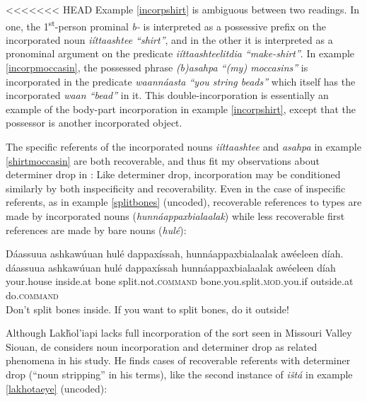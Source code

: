 \documentclass[output=paper]{LSP/langsci}
\begin{document}
<<<<<<< HEAD
Example \ref{incorpshirt} is ambiguous between two readings. In one, the 1\textsuperscript{st}-person prominal \emph{b-} is interpreted as a possessive prefix on the incorporated noun  \emph{iíttaashtee “shirt”}, and in the other it is interpreted as a pronominal argument on the predicate \emph{iíttaashteelitdia “make-shirt”}. In example \ref{incorpmoccasin}, the possessed phrase \emph{(b)asahpa “(my) moccasins”} is incorporated in the predicate \emph{waannáasta “you string beads”} which itself has the incorporated \emph{waan “bead”} in it. This double-incorporation is essentially an example of the body-part incorporation in example \ref{incorpshirt}, except that the possessor is another incorporated object.

	The specific referents of the incorporated nouns \emph{iíttaashtee} and \emph{asahpa} in example \ref{shirtmoccasin} are both recoverable, and thus fit my observations about determiner drop in : Like determiner drop, incorporation may be conditioned similarly by both inspecificity and recoverability. Even in the case of inspecific referents, as in example \ref{splitbones} (uncoded), recoverable references to types are made by incorporated nouns (\emph{‎hunnáappaxbialaalak}) while less recoverable first references are made by bare nouns (\emph{hulé}):
	 
\ea\label{splitbones}
 	Dáassuua ashkawúuan hulé dappaxíssah, hunnáappaxbialaalak awéeleen díah.\footnotemark\\
\gll	dáassuua		ashkawúuan		hulé		dappaxíssah				hunnáappaxbialaalak			awéeleen		díah\\
	your.house		inside.at		bone		split.not.\textsc{command}	bone.you.split.\textsc{mod}.you.if	outside.at		do.\textsc{command}\\
\glt	Don’t split bones inside. If you want to split bones, do it outside! 
\z

	Although Lakȟol’iapi lacks full incorporation of the sort seen in Missouri Valley Siouan, de \citet{Reuse1994} considers noun incorporation and determiner drop as related phenomena in his study. He finds cases of recoverable referents with determiner drop (“noun stripping” in his terms), like the second instance of \emph{ištá} in example \ref{lakhotaeye} (uncoded):
	
\end{document}
